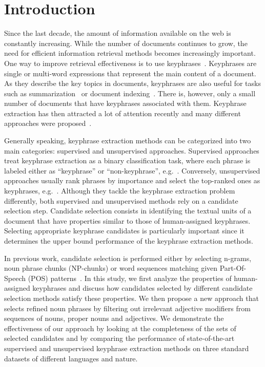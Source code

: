 \section{Introduction}
\label{sec:section}

  Since the last decade, the amount of information available on the web is
  constantly increasing. While the number of documents continues to grow, the
  need for efficient information retrieval methods becomes increasingly
  important. One way to improve retrieval effectiveness is to use
  keyphrases~\cite{jones1999phrasier}. Keyphrases are single or multi-word
  expressions that represent the main content of a document. As they describe
  the key topics in documents, keyphrases are also useful for tasks such as
  summarization~\cite{avanzo2005keyphrase} or document
  indexing~\cite{medelyan2008smalltrainingset}. There is, however, only a small
  number of documents that have keyphrases associated with them. Keyphrase
  extraction has then attracted a lot of attention recently and many different
  approaches were proposed~\cite{kim2010semeval}.

  Generally speaking, keyphrase extraction methods can be categorized into two
  main categories: supervised and unsupervised approaches. Supervised approaches
  treat keyphrase extraction as a binary classification task, where each phrase
  is labeled either as ``keyphrase'' or ``non-keyphrase'',
  e.g.~\cite{witten1999kea}. Conversely, unsupervised approaches usually rank
  phrases by importance and select the top-ranked ones as keyphrases,
  e.g.~\cite{mihalcea2004textrank}. Although they tackle the keyphrase
  extraction problem differently, both supervised and unsupervised methods rely
  on a candidate selection step. Candidate selection consists in identifying the
  textual units of a document that have properties similar to those of
  human-assigned keyphrases. Selecting appropriate keyphrase candidates is
  particularly important since it determines the upper bound performance of the
  keyphrase extraction methods.

  In previous work, candidate selection is performed either by selecting
  n-grams, noun phrase chunks (NP-chunks) or word sequences matching given
  Part-Of-Speech (POS) patterns~\cite{hulth2003keywordextraction}. In this
  study, we first analyze the properties of human-assigned keyphrases and
  discuss how candidates selected by different candidate selection methods
  satisfy these properties. We then propose a new approach that selects refined
  noun phrases by filtering out irrelevant adjective modifiers from sequences of
  nouns, proper nouns and adjectives. We demonstrate the effectiveness of our
  approach by looking at the completeness of the sets of selected candidates and
  by comparing the performance of state-of-the-art supervised and unsupervised
  keyphrase extraction methods on three standard datasets of different languages
  and nature.

